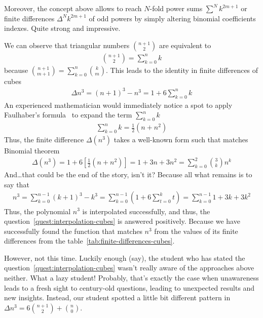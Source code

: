 Moreover, the concept above allows to reach $N$-fold power sums $\sum^N k^{2m+1}$
or finite differences $\Delta^N k^{2m+1}$ of odd powers by simply altering
binomial coefficients indexes.
Quite strong and impressive.

We can observe that triangular numbers $\binom{n+1}{2}$ are equivalent to
\begin{align*}
    \binom{n+1}{2} = \sum_{k=0}^{n} k
\end{align*}
because $\binom{n+1}{m+1} = \sum_{k=0}^{n} \binom{k}{m}$.
This leads to the identity in finite differences of cubes
\begin{align*}
    \Delta n^3 = (n+1)^3 - n^3 = 1 + 6 \sum_{k=0}^{n} k
\end{align*}
An experienced mathematician would immediately notice a spot to apply Faulhaber's formula~\cite{beardon1996sums}
to expand the term $\sum_{k=0}^{n} k$
\begin{align*}
    \sum_{k=0}^{n} k = \frac{1}{2}(n+n^2)
\end{align*}
Thus, the finite difference $\Delta(n^3)$ takes a well-known form such
that matches Binomial theorem~\cite{abramowitz1988handbook}
\begin{align*}
    \Delta(n^3)
    = 1 + 6 \left[ \frac{1}{2}(n+n^2) \right]
    = 1 + 3 n + 3 n^2
    = \sum_{k=0}^{2} \binom{3}{k} n^k
\end{align*}
And\ldots that could be the end of the story, isn't it?
Because all what remains is to say that
\begin{align*}
    n^3
    = \sum_{k=0}^{n-1} (k+1)^3 - k^3
    = \sum_{k=0}^{n-1} \left( 1 + 6 \sum_{t=0}^{k} t \right)
    = \sum_{k=0}^{n-1} 1 + 3 k + 3 k^2
\end{align*}
Thus, the polynomial $n^3$ is interpolated successfully, and thus, the question~\eqref{quest:interpolation-cubes} is answered
positively.
Because we have successfully found the function that matches $n^3$ from the values of its finite differences from the
table~\eqref{tab:finite-differences-cubes}.

However, not this time.
Luckily enough (say), the student who has stated the question~\eqref{quest:interpolation-cubes}
wasn't really aware of the approaches above neither.
What a lazy student!
Probably, that's exactly the case when unawareness leads to a fresh sight to century-old questions,
leading to unexpected results and new insights.
Instead, our student spotted a little bit different pattern in $\Delta n^3= 6 \binom{n+1}{2} + \binom{n}{0}$.

